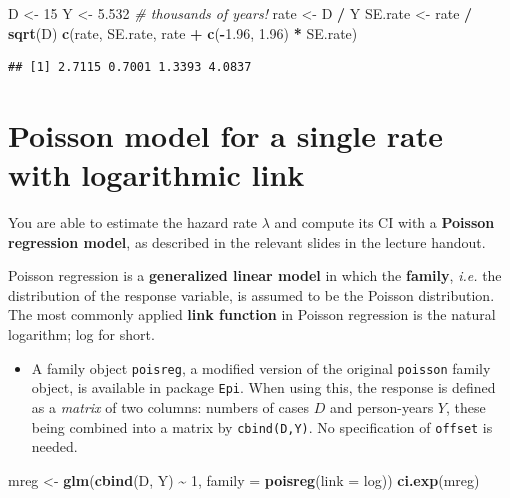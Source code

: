 \documentclass[
]{book}
\newenvironment{Shaded}{\begin{snugshade}}{\end{snugshade}}
\newcommand{\AttributeTok}[1]{\textcolor[rgb]{0.13,0.29,0.53}{#1}}
\newcommand{\CommentTok}[1]{\textcolor[rgb]{0.56,0.35,0.01}{\textit{#1}}}
\newcommand{\DecValTok}[1]{\textcolor[rgb]{0.00,0.00,0.81}{#1}}
\newcommand{\FloatTok}[1]{\textcolor[rgb]{0.00,0.00,0.81}{#1}}
\newcommand{\FunctionTok}[1]{\textcolor[rgb]{0.13,0.29,0.53}{\textbf{#1}}}
\newcommand{\NormalTok}[1]{#1}
\newcommand{\OtherTok}[1]{\textcolor[rgb]{0.56,0.35,0.01}{#1}}
\newcommand{\SpecialCharTok}[1]{\textcolor[rgb]{0.81,0.36,0.00}{\textbf{#1}}}
\providecommand{\tightlist}{%
  \setlength{\itemsep}{0pt}\setlength{\parskip}{0pt}}
\theoremstyle{definition}
\theoremstyle{definition}
\theoremstyle{definition}
\theoremstyle{definition}
\theoremstyle{remark}
\begin{document}
\begin{Shaded}
\begin{Highlighting}[]
\NormalTok{D }\OtherTok{\textless{}{-}} \DecValTok{15}
\NormalTok{Y }\OtherTok{\textless{}{-}} \FloatTok{5.532} \CommentTok{\# thousands of years!}
\NormalTok{rate }\OtherTok{\textless{}{-}}\NormalTok{ D }\SpecialCharTok{/}\NormalTok{ Y}
\NormalTok{SE.rate }\OtherTok{\textless{}{-}}\NormalTok{ rate }\SpecialCharTok{/} \FunctionTok{sqrt}\NormalTok{(D)}
\FunctionTok{c}\NormalTok{(rate, SE.rate, rate }\SpecialCharTok{+} \FunctionTok{c}\NormalTok{(}\SpecialCharTok{{-}}\FloatTok{1.96}\NormalTok{, }\FloatTok{1.96}\NormalTok{) }\SpecialCharTok{*}\NormalTok{ SE.rate)}
\end{Highlighting}
\end{Shaded}

\begin{verbatim}
## [1] 2.7115 0.7001 1.3393 4.0837
\end{verbatim}

\section{Poisson model for a single rate with logarithmic link}\label{poisson-model-for-a-single-rate-with-logarithmic-link}

You are able to estimate the hazard rate \(\lambda\) and compute its CI with a \textbf{Poisson regression model}, as described in the relevant slides in the lecture handout.

Poisson regression is a \textbf{generalized linear model} in which the \textbf{family}, \emph{i.e.} the distribution of the response variable, is assumed to be the Poisson distribution. The most commonly applied \textbf{link function}
in Poisson regression is the natural logarithm; log for short.

\begin{itemize}
\tightlist
\item
  A family object \texttt{poisreg}, a modified version of the original \texttt{poisson} family object, is available
  in package \texttt{Epi}. When using this, the response is defined as a \emph{matrix} of two columns: numbers
  of cases \(D\) and person-years \(Y\), these being combined into a matrix by \texttt{cbind(D,Y)}. No specification
  of \texttt{offset} is needed.
\end{itemize}

\begin{Shaded}
\begin{Highlighting}[]
\NormalTok{mreg }\OtherTok{\textless{}{-}} \FunctionTok{glm}\NormalTok{(}\FunctionTok{cbind}\NormalTok{(D, Y) }\SpecialCharTok{\textasciitilde{}} \DecValTok{1}\NormalTok{, }\AttributeTok{family =} \FunctionTok{poisreg}\NormalTok{(}\AttributeTok{link =}\NormalTok{ log))}
\FunctionTok{ci.exp}\NormalTok{(mreg)}
\end{Highlighting}
\end{Shaded}
\end{document}
